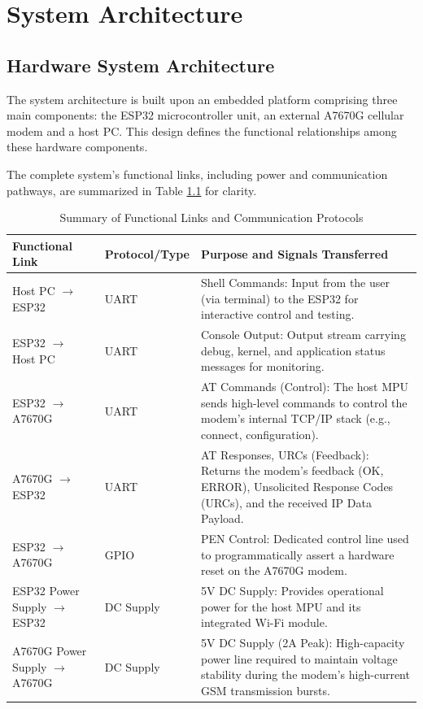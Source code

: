 \chapter{System Architecture}

\section{Hardware System Architecture}
\label{sec:hardware_architecture}

The system architecture is built upon an embedded platform comprising three main components: the ESP32 microcontroller unit, an external A7670G cellular modem and a host PC. This design defines the functional relationships among these hardware components.

The complete system's functional links, including power and communication pathways, are summarized in Table \ref{tab:arch_links} for clarity.

\begin{table}[H]
    \centering
    \caption{Summary of Functional Links and Communication Protocols}
    \label{tab:arch_links}
    \renewcommand{\arraystretch}{1.2}
    \begin{tabular}{>{\raggedright\arraybackslash}p{4cm} 
                    >{\raggedright\arraybackslash}p{2cm} 
                    >{\raggedright\arraybackslash}p{6.5cm}}
        \hline
        Functional Link & Protocol/Type & Purpose and Signals Transferred \\
        \hline
        Host PC $\rightarrow$ ESP32 & UART & Shell Commands: Input from the user (via terminal) to the ESP32 for interactive control and testing. \\
        \hline
        ESP32 $\rightarrow$ Host PC & UART & Console Output: Output stream carrying debug, kernel, and application status messages for monitoring. \\
        \hline
        ESP32 $\rightarrow$ A7670G & UART & AT Commands (Control): The host MPU sends high-level commands to control the modem's internal TCP/IP stack (e.g., connect, configuration). \\
        \hline
        A7670G $\rightarrow$ ESP32 & UART & AT Responses, URCs (Feedback): Returns the modem's feedback (OK, ERROR), Unsolicited Response Codes (URCs), and the received IP Data Payload. \\
        \hline
        ESP32 $\rightarrow$ A7670G & GPIO & PEN Control: Dedicated control line used to programmatically assert a hardware reset on the A7670G modem. \\
        \hline
        ESP32 Power Supply $\rightarrow$ ESP32 & DC Supply & 5V DC Supply: Provides operational power for the host MPU and its integrated Wi-Fi module. \\
        \hline
        A7670G Power Supply $\rightarrow$ A7670G & DC Supply & 5V DC Supply (2A Peak): High-capacity power line required to maintain voltage stability during the modem's high-current GSM transmission bursts. \\
        \hline
    \end{tabular}
\end{table} 

